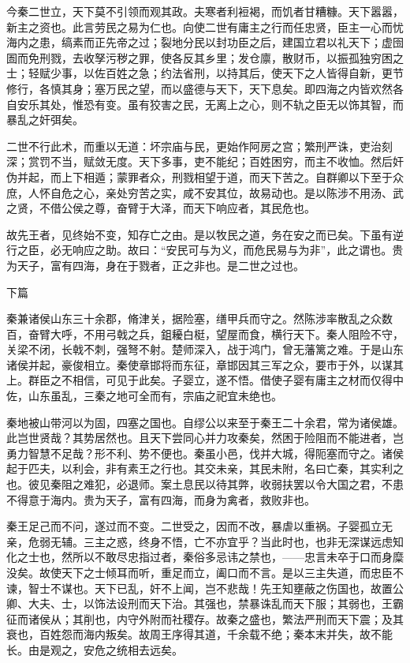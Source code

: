 \documentclass[UTF8,titlepage,oneside]{ctexbook}
\begin{document}
今秦二世立，天下莫不引领而观其政。夫寒者利裋褐，而饥者甘糟糠。天下嚣嚣，新主之资也。此言劳民之易为仁也。向使二世有庸主之行而任忠贤，臣主一心而忧海内之患，缟素而正先帝之过；裂地分民以封功臣之后，建国立君以礼天下；虚囹圄而免刑戮，去收孥污秽之罪，使各反其乡里；发仓廪，散财币，以振孤独穷困之士；轻赋少事，以佐百姓之急；约法省刑，以持其后，使天下之人皆得自新，更节修行，各慎其身；塞万民之望，而以盛德与天下，天下息矣。即四海之内皆欢然各自安乐其处，惟恐有变。虽有狡害之民，无离上之心，则不轨之臣无以饰其智，而暴乱之奸弭矣。

二世不行此术，而重以无道：坏宗庙与民，更始作阿房之宫；繁刑严诛，吏治刻深；赏罚不当，赋敛无度。天下多事，吏不能纪；百姓困穷，而主不收恤。然后奸伪并起，而上下相遁；蒙罪者众，刑戮相望于道，而天下苦之。自群卿以下至于众庶，人怀自危之心，亲处穷苦之实，咸不安其位，故易动也。是以陈涉不用汤、武之贤，不借公侯之尊，奋臂于大泽，而天下响应者，其民危也。

故先王者，见终始不变，知存亡之由。是以牧民之道，务在安之而已矣。下虽有逆行之臣，必无响应之助。故曰：“安民可与为义，而危民易与为非”，此之谓也。贵为天子，富有四海，身在于戮者，正之非也。是二世之过也。


下篇

秦兼诸侯山东三十余郡，脩津关，据险塞，缮甲兵而守之。然陈涉率散乱之众数百，奋臂大呼，不用弓戟之兵，鉏耰白梃，望屋而食，横行天下。秦人阻险不守，关梁不闭，长戟不刺，强弩不射。楚师深入，战于鸿门，曾无藩篱之难。于是山东诸侯并起，豪俊相立。秦使章邯将而东征，章邯因其三军之众，要市于外，以谋其上。群臣之不相信，可见于此矣。子婴立，遂不悟。借使子婴有庸主之材而仅得中佐，山东虽乱，三秦之地可全而有，宗庙之祀宜未绝也。

秦地被山带河以为固，四塞之国也。自缪公以来至于秦王二十余君，常为诸侯雄。此岂世贤哉？其势居然也。且天下尝同心并力攻秦矣，然困于险阻而不能进者，岂勇力智慧不足哉？形不利、势不便也。秦虽小邑，伐并大城，得阨塞而守之。诸侯起于匹夫，以利会，非有素王之行也。其交未亲，其民未附，名曰亡秦，其实利之也。彼见秦阻之难犯，必退师。案土息民以待其弊，收弱扶罢以令大国之君，不患不得意于海内。贵为天子，富有四海，而身为禽者，救败非也。

秦王足己而不问，遂过而不变。二世受之，因而不改，暴虐以重祸。子婴孤立无亲，危弱无辅。三主之惑，终身不悟，亡不亦宜乎？当此时也，也非无深谋远虑知化之士也，然所以不敢尽忠指过者，秦俗多忌讳之禁也，——忠言未卒于口而身糜没矣。故使天下之士倾耳而听，重足而立，阖口而不言。是以三主失道，而忠臣不谏，智士不谋也。天下已乱，奸不上闻，岂不悲哉！先王知壅蔽之伤国也，故置公卿、大夫、士，以饰法设刑而天下治。其强也，禁暴诛乱而天下服；其弱也，王霸征而诸侯从；其削也，内守外附而社稷存。故秦之盛也，繁法严刑而天下震；及其衰也，百姓怨而海内叛矣。故周王序得其道，千余载不绝；秦本末并失，故不能长。由是观之，安危之统相去远矣。
\end{document}
